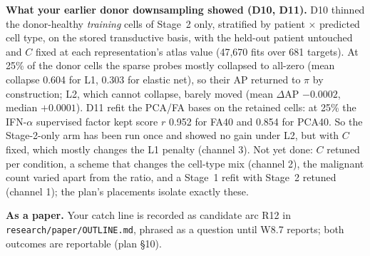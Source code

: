 \textbf{What your earlier donor downsampling showed (D10, D11).} D10 thinned the donor-healthy \emph{training} cells of Stage~2 only, stratified by patient $\times$ predicted cell type, on the stored transductive basis, with the held-out patient untouched and $C$ fixed at each representation's atlas value (47,670 fits over 681 targets). At 25\% of the donor cells the sparse probes mostly collapsed to all-zero (mean collapse 0.604 for L1, 0.303 for elastic net), so their AP returned to $\pi$ by construction; L2, which cannot collapse, barely moved (mean $\Delta$AP $-0.0002$, median $+0.0001$). D11 refit the PCA/FA bases on the retained cells: at 25\% the IFN-$\alpha$ supervised factor kept score $r$ 0.952 for FA40 and 0.854 for PCA40. So the Stage-2-only arm has been run once and showed no gain under L2, but with $C$ fixed, which mostly changes the L1 penalty (channel 3). Not yet done: $C$ retuned per condition, a scheme that changes the cell-type mix (channel 2), the malignant count varied apart from the ratio, and a Stage~1 refit with Stage~2 retuned (channel 1); the plan's placements isolate exactly these. 

\textbf{As a paper.} Your catch line is recorded as candidate arc R12 in \texttt{research/\allowbreak paper/\allowbreak OUTLINE.md}, phrased as a question until W8.7 reports; both outcomes are reportable (plan \S10).

